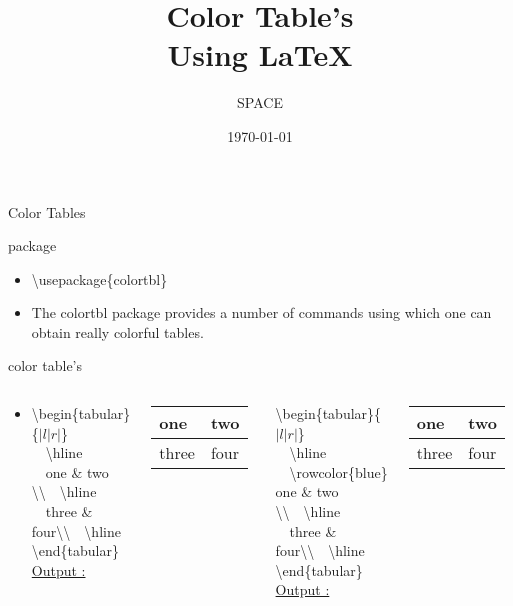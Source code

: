 \documentclass{beamer}
\title{Color Table's \\ Using \LaTeX}
\author{SPACE}
\date{\today}
\begin{document}
\maketitle

\begin{frame}{Color Tables }
\begin{block}{package}
\begin{itemize}
\item \textbackslash usepackage\{colortbl\}
\item The colortbl package provides a number of commands using which one can obtain really
colorful tables.
\end{itemize}
\end{block}
\end{frame}

\begin{frame}{color table's}
\begin{itemize}
\pause\item[]\begin{columns}[c]
\column{1.5in}
\textbackslash begin\{tabular\}\{$|l|r|$\}\\
~~\textbackslash hline \\
~~one \& two  \textbackslash\textbackslash ~~\textbackslash hline \\
~~three \& four\textbackslash\textbackslash ~~\textbackslash hline \\
\textbackslash end\{tabular\}\\
\vspace{0.3cm} \underline{Output :}\\
\begin{tabular}{|l|l|}
  \hline
  one & two \\ \hline
  three & four \\ \hline
\end{tabular}
\column{1.5in}
\textbackslash begin\{tabular\}\{$|l|r|$\}\\
~~\textbackslash hline \\
~~\textbackslash rowcolor\{blue\} one \& two  \textbackslash\textbackslash ~~\textbackslash hline \\
~~three \& four\textbackslash\textbackslash ~~\textbackslash hline \\
\textbackslash end\{tabular\}\\
\vspace{0.3cm} \underline{Output :}\\
\begin{tabular}{|l|l|}
  \hline
\rowcolor{blue} one & two \\ \hline
\rowcolor{green} three & four \\ \hline
\end{tabular}
\end{columns}
\end{itemize}
\end{frame}
\end{document}
